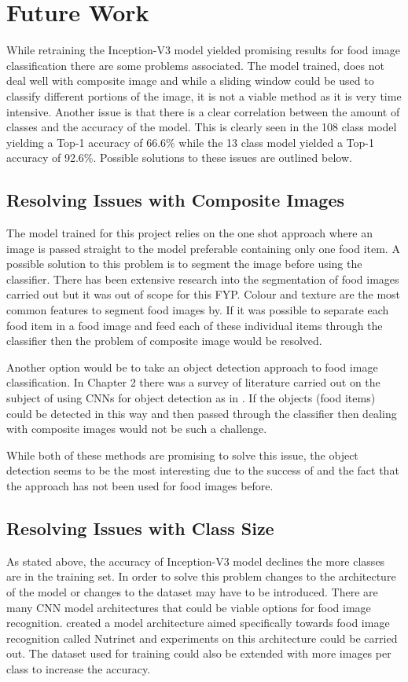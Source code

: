 \section{Future Work}
While retraining the Inception-V3 model yielded promising results for food image classification there are some problems associated.
The model trained, does not deal well with composite image and while a sliding window could be used to classify different portions of the image, it is not a viable method as it is very time intensive.
Another issue is that there is a clear correlation between the amount of classes and the accuracy of the model.
This is clearly seen in the 108 class model yielding a Top-1 accuracy of 66.6\% while the 13 class model yielded a Top-1 accuracy of 92.6\%.
Possible solutions to these issues are outlined below.

\subsection*{Resolving Issues with Composite Images}
The model trained for this project relies on the one shot approach where an image is passed straight to the model preferable containing only one food item.
A possible solution to this problem is to segment the image before using the classifier.
There has been extensive research into the segmentation of food images carried out but it was out of scope for this FYP.
Colour and texture are the most common features to segment food images by.
If it was possible to separate each food item in a food image and feed each of these individual items through the classifier then the problem of composite image would be resolved.

Another option would be to take an object detection approach to food image classification.
In Chapter 2 there was a survey of literature carried out on the subject of
using CNNs for object detection as in \parencite{maskRcnn}.
If the objects (food items) could be detected in this way and then passed through the classifier then dealing with composite images would not be such a challenge.

While both of these methods are promising to solve this issue, the object detection seems to be the most interesting due to the success of \parencite{maskRcnn} and the fact that the approach has not been used for food images before.

\subsection*{Resolving Issues with Class Size}
As stated above, the accuracy of Inception-V3 model declines the more classes are in the training set.
In order to solve this problem changes to the architecture of the model or
changes to the dataset may have to be introduced.
There are many CNN model architectures that could be viable options for food image recognition.
\parencite{nutrinet} created a model architecture aimed specifically towards food image recognition called Nutrinet and experiments on this architecture could be carried out.
The dataset used for training could also be extended with more images per class to increase the accuracy.
